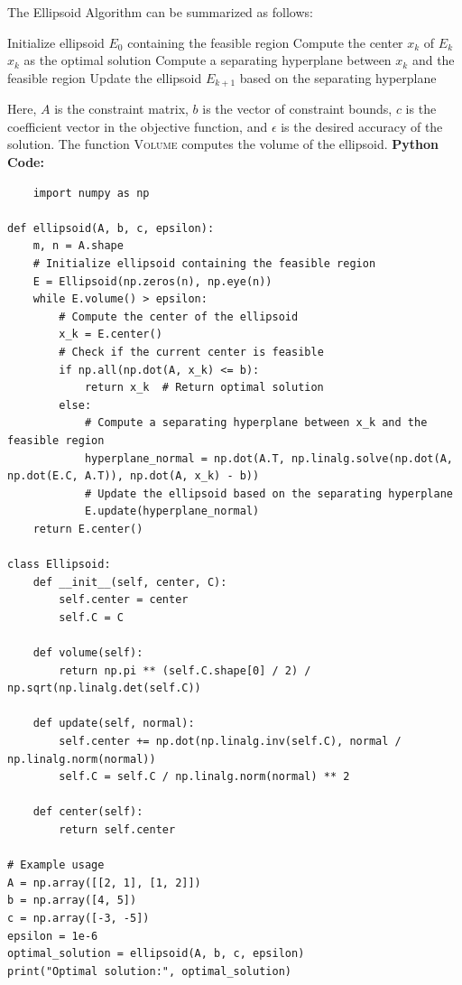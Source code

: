 \documentclass[12pt]{book} %
\begin{document}
The Ellipsoid Algorithm can be summarized as follows:
\FloatBarrier
\begin{algorithm}
\caption{Ellipsoid Algorithm}
\begin{algorithmic}[1]
    \State Initialize ellipsoid $E_0$ containing the feasible region
        \State Compute the center $x_k$ of $E_k$
            \State \Return $x_k$ as the optimal solution
        \Else
            \State Compute a separating hyperplane between $x_k$ and the feasible region
            \State Update the ellipsoid $E_{k+1}$ based on the separating hyperplane
        \EndIf
    \EndWhile
\EndFunction
\end{algorithmic}
\end{algorithm}
\FloatBarrier
Here, \(A\) is the constraint matrix, \(b\) is the vector of constraint bounds, \(c\) is the coefficient vector in the objective function, and \(\epsilon\) is the desired accuracy of the solution. The function \textsc{Volume} computes the volume of the ellipsoid.
\FloatBarrier
\textbf{Python Code:}
\FloatBarrier
\begin{lstlisting}
    import numpy as np

def ellipsoid(A, b, c, epsilon):
    m, n = A.shape
    # Initialize ellipsoid containing the feasible region
    E = Ellipsoid(np.zeros(n), np.eye(n))
    while E.volume() > epsilon:
        # Compute the center of the ellipsoid
        x_k = E.center()
        # Check if the current center is feasible
        if np.all(np.dot(A, x_k) <= b):
            return x_k  # Return optimal solution
        else:
            # Compute a separating hyperplane between x_k and the feasible region
            hyperplane_normal = np.dot(A.T, np.linalg.solve(np.dot(A, np.dot(E.C, A.T)), np.dot(A, x_k) - b))
            # Update the ellipsoid based on the separating hyperplane
            E.update(hyperplane_normal)
    return E.center()

class Ellipsoid:
    def __init__(self, center, C):
        self.center = center
        self.C = C
    
    def volume(self):
        return np.pi ** (self.C.shape[0] / 2) / np.sqrt(np.linalg.det(self.C))
    
    def update(self, normal):
        self.center += np.dot(np.linalg.inv(self.C), normal / np.linalg.norm(normal))
        self.C = self.C / np.linalg.norm(normal) ** 2
    
    def center(self):
        return self.center

# Example usage
A = np.array([[2, 1], [1, 2]])
b = np.array([4, 5])
c = np.array([-3, -5])
epsilon = 1e-6
optimal_solution = ellipsoid(A, b, c, epsilon)
print("Optimal solution:", optimal_solution)
\end{lstlisting}
\end{document}
